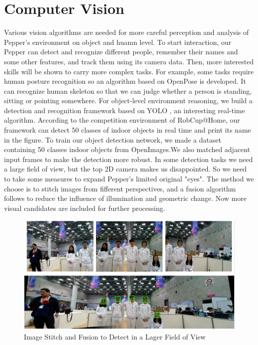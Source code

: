\section{Computer Vision}
\label{sec:vision}
Various vision algorithms are needed for more careful perception and analysis of Pepper's environment on object and huamn level. 
To start interaction, our Pepper can detect and recognize different people, remember their names and some other features, and track them using its camera data. 
Then, more interested skills will be shown to carry more complex tasks. For example, some tasks require human posture recognition so an algorithm based on OpenPose \cite{Cao_2017_CVPR} is developed. 
It can recognize human skeleton so that we can judge whether a person is standing, sitting or pointing somewhere. For object-level environment reasoning, we build a detection and recognition framework based on YOLO \cite{Redmon2018YOLOv3AI}, an interesting real-time algorithm. 
According to the competition environment of RobCup@Home, our framework can detect 50 classes of indoor objects in real time and print its name in the figure.
To train our object detection network, we made a dataset containing 50 classes indoor objects from OpenImages.We also matched adjacent input frames to make the detection more robust.
In some detection tasks we need a large field of view, but the top 2D camera makes us disappointed. So we need to take some measures to expand Pepper's limited original "eyes".
The method we choose is to stitch images from fifferent perspectives, and a fusion algorithm follows to reduce the influence of illumination and geometric change.
Now more visual candidates are included for further processing.
\begin{figure}[h!]
\centering
\includegraphics[width=1.\textwidth]{figs/vision1.png}
\caption{Image Stitch and Fusion to Detect in a Lager Field of View}
\label{fig:vision1}
\end{figure}
